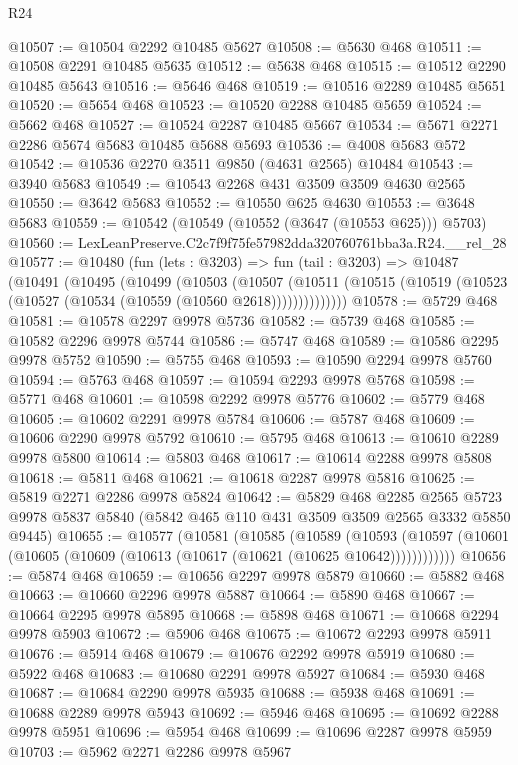 \begin{lexlean}{R24}
\begin{coremodule}
@10507 := @10504 @2292 @10485 @5627
@10508 := @5630 @468
@10511 := @10508 @2291 @10485 @5635
@10512 := @5638 @468
@10515 := @10512 @2290 @10485 @5643
@10516 := @5646 @468
@10519 := @10516 @2289 @10485 @5651
@10520 := @5654 @468
@10523 := @10520 @2288 @10485 @5659
@10524 := @5662 @468
@10527 := @10524 @2287 @10485 @5667
@10534 := @5671 @2271 @2286 @5674 @5683 @10485 @5688 @5693
@10536 := @4008 @5683 @572
@10542 := @10536 @2270 @3511 @9850 (@4631 @2565) @10484
@10543 := @3940 @5683
@10549 := @10543 @2268 @431 @3509 @3509 @4630 @2565
@10550 := @3642 @5683
@10552 := @10550 @625 @4630
@10553 := @3648 @5683
@10559 := @10542 (@10549 (@10552 (@3647 (@10553 @625))) @5703)
@10560 := LexLeanPreserve.C2c7f9f75fe57982dda320760761bba3a.R24.__rel_28
@10577 := @10480
    (fun (lets : @3203) =>
    fun (tail : @3203) =>
    @10487
      (@10491
        (@10495
          (@10499
            (@10503
              (@10507
                (@10511 (@10515 (@10519 (@10523 (@10527 (@10534 (@10559 (@10560 @2618))))))))))))))
@10578 := @5729 @468
@10581 := @10578 @2297 @9978 @5736
@10582 := @5739 @468
@10585 := @10582 @2296 @9978 @5744
@10586 := @5747 @468
@10589 := @10586 @2295 @9978 @5752
@10590 := @5755 @468
@10593 := @10590 @2294 @9978 @5760
@10594 := @5763 @468
@10597 := @10594 @2293 @9978 @5768
@10598 := @5771 @468
@10601 := @10598 @2292 @9978 @5776
@10602 := @5779 @468
@10605 := @10602 @2291 @9978 @5784
@10606 := @5787 @468
@10609 := @10606 @2290 @9978 @5792
@10610 := @5795 @468
@10613 := @10610 @2289 @9978 @5800
@10614 := @5803 @468
@10617 := @10614 @2288 @9978 @5808
@10618 := @5811 @468
@10621 := @10618 @2287 @9978 @5816
@10625 := @5819 @2271 @2286 @9978 @5824
@10642 := @5829
    @468
    @2285
    @2565
    @5723
    @9978
    @5837
    @5840
    (@5842 @465 @110 @431 @3509 @3509 @2565 @3332 @5850 @9445)
@10655 := @10577
    (@10581
      (@10585
        (@10589
          (@10593 (@10597 (@10601 (@10605 (@10609 (@10613 (@10617 (@10621 (@10625 @10642))))))))))))
@10656 := @5874 @468
@10659 := @10656 @2297 @9978 @5879
@10660 := @5882 @468
@10663 := @10660 @2296 @9978 @5887
@10664 := @5890 @468
@10667 := @10664 @2295 @9978 @5895
@10668 := @5898 @468
@10671 := @10668 @2294 @9978 @5903
@10672 := @5906 @468
@10675 := @10672 @2293 @9978 @5911
@10676 := @5914 @468
@10679 := @10676 @2292 @9978 @5919
@10680 := @5922 @468
@10683 := @10680 @2291 @9978 @5927
@10684 := @5930 @468
@10687 := @10684 @2290 @9978 @5935
@10688 := @5938 @468
@10691 := @10688 @2289 @9978 @5943
@10692 := @5946 @468
@10695 := @10692 @2288 @9978 @5951
@10696 := @5954 @468
@10699 := @10696 @2287 @9978 @5959
@10703 := @5962 @2271 @2286 @9978 @5967

\end{coremodule}
\end{lexlean}
